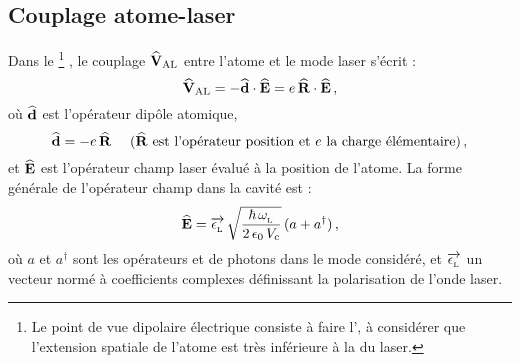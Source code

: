 \subsection{Couplage atome-laser}
Dans le %
\footnote{Le point de vue dipolaire électrique consiste à faire l', \cad à considérer que l'extension spatiale de l'atome est très inférieure à la \lo du laser. }%
, le couplage ${\mathbf{\widehat{V}_{\rm AL}}}$ entre l'atome et le mode laser s'écrit :
\begin{equation}
\VAL = - \OperP \cdot \OperE = e\,\OperR\cdot\OperE
\virguleformule
	\label{eq:VAL}
\end{equation}
où ${\mathbf{\widehat{d}}}$ est l'opérateur dipôle atomique,
\begin{equation}
\OperP = - e \, \OperR ~~~~\mbox{($\OperR$ est l'opérateur position et $e$ la charge élémentaire)}
\virguleformule
	\label{eq:OpPos}
\end{equation}
et ${\mathbf{\widehat{E}}}$ est l'opérateur champ laser évalué à la position de l'atome. La forme générale de l'opérateur champ dans la cavité est : 
\begin{equation}
	\OperE = \Polarisation 
	\, \sqrt{\frac{\hbar\,\pulsLaser}{2\,\epsilon_0\,\Vcav}} 
	\, (a + a^\dag)
\virguleformule
	\label{eq:OpChamp}
\end{equation}
où $a$ et $a^\dag$ sont les opérateurs  et  de photons dans le mode considéré, et ${\overrightarrow{\epsilon_{_{\rm L}}}}$ un vecteur normé à coefficients complexes définissant la polarisation de l'onde laser.

